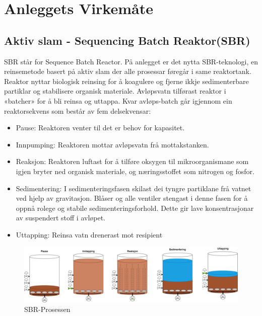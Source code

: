 \chapter{Anleggets Virkemåte}
\thispagestyle{fancy}

\section{Aktiv slam - Sequencing Batch Reaktor(SBR)} 
SBR står for Sequence Batch Reactor. På anlegget er det nytta SBR-teknologi, en reinsemetode basert på aktiv slam der alle prosessar føregår i same reaktortank. 
Reaktor nyttar biologisk reinsing for å koagulere og fjerne ikkje sedimenterbare partiklar og stabilisere organisk materiale. Avløpsvatn tilførast reaktor i «batcher» for å bli reinsa og uttappa. 
Kvar avløps-batch går igjennom ein reaktorsekvens som består av fem delsekvensar:

\begin{itemize}
    \item Pause: \newline Reaktoren venter til det er behov for kapasitet.
    \item Innpumping: \newline Reaktoren mottar avløpsvatn frå mottakstanken. 
    \item Reaksjon: \newline Reaktoren luftast for å tilføre oksygen til mikroorganismane som igjen bryter ned organisk materiale, 
    og næringsstoffet som nitrogen og fosfor.
    \item Sedimentering: \newline 
    I sedimenteringsfasen skilast dei tyngre partiklane frå vatnet ved hjelp av gravitasjon. 
    Blåser og alle ventiler stengast i denne fasen for å oppnå rolege og stabile sedimenteringsforhold. Dette gir lave konsentrasjonar av suspendert stoff i avløpet.
    \item Uttapping: \newline Reinsa vatn drenerast mot resipient
\end{itemize}

\begin{figure}[htbp]
    \centering
    \includegraphics[width=1\textwidth]{Figurar/SBR-Prosessen.png}
    \caption{SBR-Prosessen}\label{fig:SBR-prossessen}
\end{figure}
    